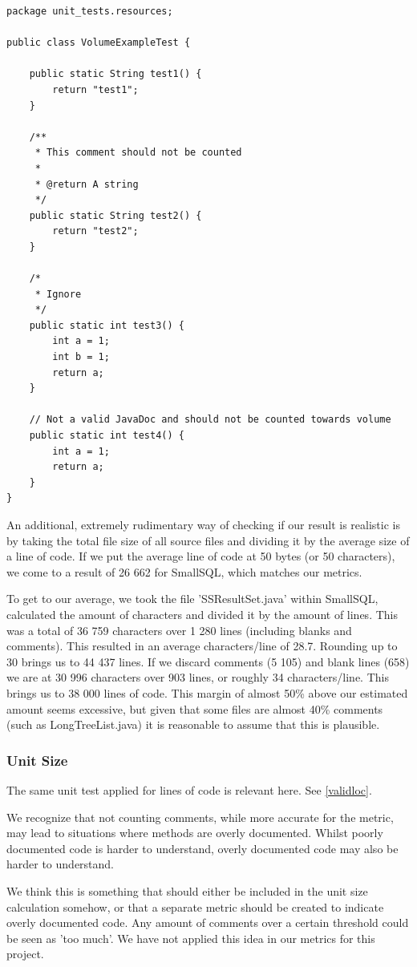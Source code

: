 \documentclass{article}
\begin{document}
\begin{lstlisting}
package unit_tests.resources;

public class VolumeExampleTest {
	
	public static String test1() {
		return "test1";
	}
	
	/**
	 * This comment should not be counted
	 * 
	 * @return A string
	 */
	public static String test2() {
		return "test2";
	}
	
	/*
	 * Ignore
	 */
	public static int test3() {
		int a = 1;
		int b = 1;
		return a;
	}
	
	// Not a valid JavaDoc and should not be counted towards volume
	public static int test4() {
		int a = 1;
		return a;
	}
}
\end{lstlisting}

An additional, extremely rudimentary way of checking if our result is realistic is by taking the total file size of all source files and dividing it by the average size of a line of code. If we put the average line of code at 50 bytes (or 50 characters), we come to a result of 26 662 for SmallSQL, which matches our metrics.

To get to our average, we took the file 'SSResultSet.java' within SmallSQL, calculated the amount of characters and divided it by the amount of lines. This was a total of 36 759 characters over 1 280 lines (including blanks and comments). This resulted in an average characters/line of 28.7. Rounding up to 30 brings us to 44 437 lines. If we discard comments (5 105) and blank lines (658) we are at 30 996 characters over 903 lines, or roughly 34 characters/line. This brings us to 38 000 lines of code. This margin of almost 50\% above our estimated amount seems excessive, but given that some files are almost 40\% comments (such as LongTreeList.java) it is reasonable to assume that this is plausible.

\subsubsection{Unit Size} \label{validunitsize}
The same unit test applied for lines of code is relevant here. See \ref{validloc}.

We recognize that not counting comments, while more accurate for the metric, may lead to situations where methods are overly documented. Whilst poorly documented code is harder to understand, overly documented code may also be harder to understand.

We think this is something that should either be included in the unit size calculation somehow, or that a separate metric should be created to indicate overly documented code. Any amount of comments over a certain threshold could be seen as 'too much'. We have not applied this idea in our metrics for this project.
\end{document}
